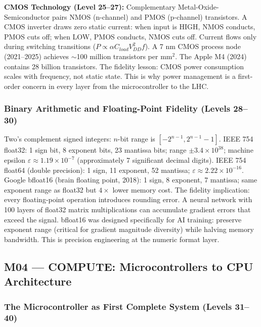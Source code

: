 \documentclass[11pt,letterpaper]{article}
\begin{document}
\textbf{CMOS Technology (Level 25--27):}
Complementary Metal-Oxide-Semiconductor pairs NMOS (n-channel) and PMOS (p-channel) transistors.
A CMOS inverter draws zero static current: when input is HIGH, NMOS conducts, PMOS cuts off; when
LOW, PMOS conducts, NMOS cuts off. Current flows only during switching transitions
($P \propto \alpha C_{load} V_{DD}^2 f$). A 7 nm CMOS process node (2021--2025) achieves
$\sim$100 million transistors per mm$^2$. The Apple M4 (2024) contains 28 billion transistors.
The fidelity lesson: CMOS power consumption scales with frequency, not static state. This is why
power management is a first-order concern in every layer from the microcontroller to the LHC.

\subsubsection{Binary Arithmetic and Floating-Point Fidelity (Levels 28--30)}

Two's complement signed integers: $n$-bit range is $[-2^{n-1}, 2^{n-1}-1]$. IEEE 754 float32:
1 sign bit, 8 exponent bits, 23 mantissa bits; range $\pm 3.4 \times 10^{38}$; machine epsilon
$\varepsilon \approx 1.19 \times 10^{-7}$ (approximately 7 significant decimal digits). IEEE 754
float64 (double precision): 1 sign, 11 exponent, 52 mantissa; $\varepsilon \approx 2.22 \times
10^{-16}$. Google bfloat16 (brain floating point, 2018): 1 sign, 8 exponent, 7 mantissa; same
exponent range as float32 but $4\times$ lower memory cost. The fidelity implication: every
floating-point operation introduces rounding error. A neural network with 100 layers of float32
matrix multiplications can accumulate gradient errors that exceed the signal. bfloat16 was
designed specifically for AI training: preserve exponent range (critical for gradient magnitude
diversity) while halving memory bandwidth. This is precision engineering at the numeric format
layer.

\subsection{M04 --- COMPUTE: Microcontrollers to CPU Architecture}

\subsubsection{The Microcontroller as First Complete System (Levels 31--40)}
\end{document}

